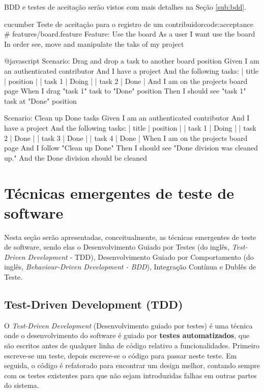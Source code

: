 BDD e testes de aceitação serão vistos com mais detalhes na Seção \ref{sub:bdd}.

\begin{mycode}{cucumber}%
{Teste de aceitação para o registro de um contribuidor}{code:acceptance}
# features/board.feature
Feature: Use the board
  As a user
  I want use the board
  In order see, move and manipulate the taks of my project

  @javascript
  Scenario: Drag and drop a task to another board position
    Given I am an authenticated contributor
    And I have a project
    And the following tasks:
      | title  | position |
      | task 1 | Doing    |
      | task 2 | Done     |
    And I am on the projects board page
    When I drag "task 1" task to "Done" position
    Then I should see "task 1" task at "Done" position

  Scenario: Clean up Done tasks
    Given I am an authenticated contributor
    And I have a project
    And the following tasks:
      | title  | position |
      | task 1 | Doing    |
      | task 2 | Done     |
      | task 3 | Done     |
      | task 4 | Done     |
    When I am on the projects board page
    And I follow "Clean up Done"
    Then I should see "Done division was cleaned up."
    And the Done division should be cleaned
\end{mycode}


\section{Técnicas emergentes de teste de software}
\label{sec:tecnicas_emergentes_de_teste_de_software}

Nesta seção serão apresentadas, conceitualmente, as técnicas emergentes de teste de software, sendo elas o Desenvolvimento Guiado por Testes (do inglês, \textit{Test-Driven Development} - TDD), Desenvolvimento Guiado por Comportamento (do inglês, \textit{Behaviour-Driven Development - BDD}), Integração Contínua e Dublês de Teste.

\subsection{Test-Driven Development (TDD)}
\label{sub:tdd}

O \textit{Test-Driven Development} (Desenvolvimento guiado por testes) é uma técnica onde o desenvolvimento do software é guiado por \textbf{testes automatizados}, que são escritos antes de qualquer linha de código relativo a funcionalidades. Primeiro escreve-se um teste, depois escreve-se o código para passar neste teste. Em seguida, o código é refatorado para encontrar um design melhor, contando sempre com os testes existentes para que não sejam introduzidas falhas em outras partes do sistema.

